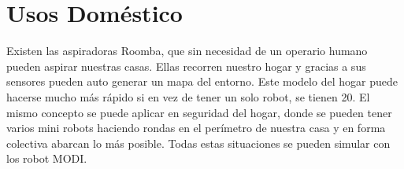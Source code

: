 \section{Usos Doméstico}

Existen las aspiradoras Roomba, que sin necesidad de un operario humano pueden aspirar nuestras casas. Ellas recorren nuestro hogar y gracias a sus sensores pueden auto generar un mapa del entorno. Este modelo del hogar puede hacerse mucho más rápido si en vez de tener un solo robot, se tienen 20. El mismo concepto se puede aplicar en seguridad del hogar, donde se pueden tener varios mini robots haciendo rondas en el perímetro de nuestra casa y en forma colectiva abarcan lo más posible. Todas estas situaciones se pueden simular con los robot MODI.
